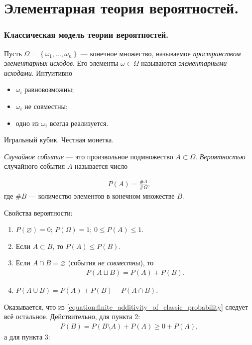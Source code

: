 \documentclass[../main.tex]{subfiles}
\begin{document}
\part{Элементарная теория вероятностей.}
\section{Классическая модель теории вероятностей.}

\begin{df*}
 Пусть $\Omega = \left\{ \omega_1, \ldots, \omega_n \right\}$ --- конечное множество, называемое \textit{пространством элементарных исходов}. Его элементы $ \omega \in \Omega $ называются \textit{элементарными исходами}. Интуитивно
 \begin{itemize}
  \item $\omega_i$ равновозможны;
  \item $\omega_i$ не совместны;
  \item одно из $\omega_i$ всегда реализуется.
 \end{itemize}
\end{df*}
\begin{exmpl*}
 Игральный кубик. Честная монетка.
\end{exmpl*}

\begin{df}
 \textit{Случайное событие}  --- это произвольное подмножество $A \subset \Omega$. \textit{Вероятностью} случайного события $A$ называется число

 \begin{align*}
  P(A) = \frac{\# A}{\# \Omega}
 ,\end{align*} где $\# B$ --- количество элементов в конечном множестве $B$.
\end{df}

\begin{prop*}
 Свойства вероятности:
 \begin{enumerate}
  \item $P(\varnothing) = 0$; $P(\Omega) = 1$; $0 \leqslant P(A) \leqslant 1$.
  \item Если $A \subset B$, то $P(A) \leqslant P(B)$.
  \item Если $A \cap B = \varnothing$ (события \textit{не совместны}), то
   \begin{align}
    \label{equation:finite_additivity_of_classic_probability}
    P(A \sqcup B) = P(A) + P(B)
   .\end{align} 
  \item $P(A \cup B) = P(A) + P(B) - P(A \cap B)$.
 \end{enumerate}
\end{prop*}
Оказывается, что из \eqref{equation:finite_additivity_of_classic_probability} следует всё остальное. Действительно, для пункта 2:
\begin{align*}
 P(B) = P(B \setminus A) + P(A) \geqslant 0 + P(A),
\end{align*}  а для пункта 3:
\end{document}
